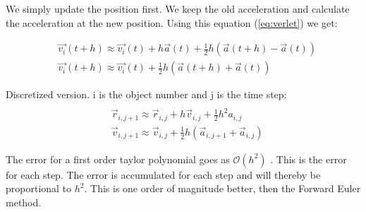 We simply update the position first. We keep the old acceleration and calculate the acceleration at the new position.  Using this equation (\ref{eq:verlet}) we get: 

\begin{align*}
	&\vec{v_i}(t+h) \approx \vec{v_i}(t) + h \vec{a}(t) + \frac{1}{2} h(\vec{a}(t+h) - \vec{a}(t))
	\\
	&\vec{v_i}(t+h) \approx \vec{v_i}(t) + \frac{1}{2} h(\vec{a}(t+h) + \vec{a}(t))
\end{align*}

Discretized version. i is the object number and j is the time step:
\begin{align*}
	\\
	&\vec{r}_{i,j+1} \approx \vec{r}_{i,j} + h \vec{v}_{i,j} + \frac{1}{2} h^2 a_{i,j}
	\\
	&\vec{v}_{i,j+1} \approx \vec{v}_{i,j} +\frac{1}{2} h(\vec{a}_{i,j+1} + \vec{a}_{i,j})
\end{align*}


The error for a first order taylor polynomial goes as $\mathcal{O}(h^2)$ . This is the error for each step. The error is accumulated for each step and will thereby be proportional to $h^2$. This is one order of magnitude better, then the Forward Euler method. 

















